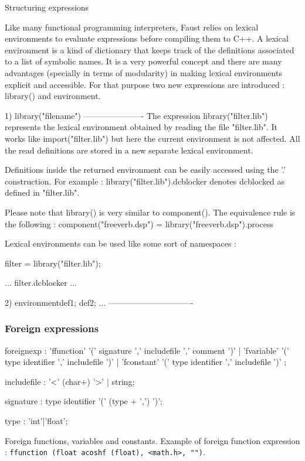 \documentclass{article}
\begin{document}
Structuring expressions

Like many functional programming interpreters, Faust relies on lexical 
environments to evaluate expressions before compiling them to C++. A 
lexical environment is a kind of dictionary that keeps track of the 
definitions associated to a list of symbolic names. It is a very 
powerful concept and there are many advantages (specially in terms of 
modularity) in making lexical environments explicit and accessible. For 
that purpose two new expressions are introduced : library() and 
environment{}.

1) library("filename")
----------------------
The expression library("filter.lib") represents the lexical environment 
obtained by reading the file "filter.lib". It works like 
import("filter.lib") but here the current environment is not affected. 
All the read definitions are stored in a new separate lexical environment.

Definitions inside the returned environment can be easily accessed using 
the '.' construction. For example :
    library("filter.lib").dcblocker
denotes dcblocked as defined in "filter.lib".

Please note that library() is very similar to component(). The 
equivalence rule is the following :
    component("freeverb.dsp") = library("freeverb.dsp").process

Lexical environments can be used like some sort of namespaces :

    filter = library("filter.lib");
   
    ... filter.dcblocker ...


2) environment{def1; def2; ...}
-------------------------------



\subsubsection{Foreign expressions}

\begin{rail}
foreignexp : 'ffunction' '(' signature ',' includefile ',' comment ')' 
          | 'fvariable' '(' type identifier ',' includefile ')' 
          | 'fconstant' '(' type identifier ',' includefile ')' ;
          
includefile : '<' (char+) '>' | string;

signature : type identifier '(' (type + ',') ')';

type : 'int'|'float';
\end{rail}
Foreign functions, variables and constants. Example of foreign function expression : \lstinline'ffunction (float acoshf (float), <math.h>, "")'.
\end{document}
